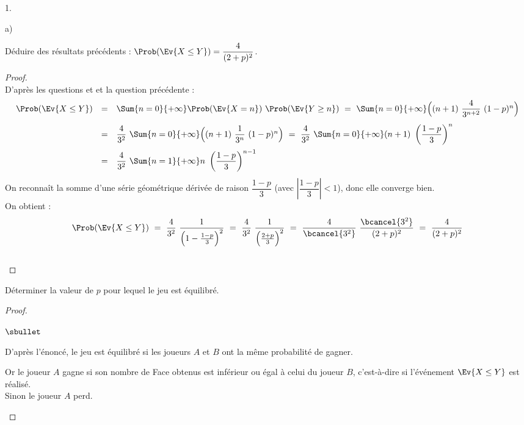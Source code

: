 \begin{noliste}{1.}
\begin{noliste}{a)}
  \item Déduire des résultats précédents : $\Prob(\Ev{X \leq Y}) =
    \dfrac{4}{(2+p)^2}$.
    
    \begin{proof}~\\
      D'après les questions  et  et la question 
      précédente :
      \[
        \begin{array}{rcl}
          \Prob(\Ev{X \leq Y}) & = &  \Sum{n=0}{+\infty}
          \Prob(\Ev{X=n}) \ \Prob(\Ev{Y \geq n})
          \ = \ \Sum{n=0}{+\infty} \Big( (n+1) \ \dfrac{4}{3^{n+2}} \
          (1-p)^n\Big)
          \\[.4cm]
          & = &  \dfrac{4}{3^2} \ \Sum{n=0}{+\infty} \Big( (n+1) \ 
          \dfrac{1}{3^n} \ (1-p)^n \Big)
          \ = \ \dfrac{4}{3^2} \ \Sum{n=0}{+\infty} (n+1) \
          \left( \dfrac{1-p}{3}\right)^n
          \\[.4cm]
          & = &  \dfrac{4}{3^2} \ \Sum{n=1}{+\infty} n \ \left(
          \dfrac{1-p}{3}\right)^{n-1} 
        \end{array}
      \]
      On reconnaît la somme d'une série géométrique dérivée de raison 
      $\dfrac{1-p}{3}$ (avec $\left\vert \dfrac{1-p}{3} \right\vert 
      <1$), donc elle converge bien.\\
      On obtient :
      \[
        \Prob(\Ev{X \leq Y}) \ = \ \dfrac{4}{3^2} \ 
        \dfrac{1}{\Big(1- \frac{1-p}{3}\Big)^2}
        \ = \ \dfrac{4}{3^2} \ \dfrac{1}{\Big(\frac{2+p}{3}\Big)^2}
        \ = \ \dfrac{4}{\bcancel{3^2}} \ 
        \dfrac{\bcancel{3^2}}{(2+p)^2} \ = \ 
        \dfrac{4}{(2+p)^2}
      \]
      ~\\[-1cm]
    \end{proof}

    
    \item Déterminer la valeur de $p$ pour lequel le jeu est équilibré.
    
    \begin{proof}~
      \begin{noliste}{$\sbullet$}
	\item D'après l'énoncé, le jeu est équilibré si les joueurs $A$
	et $B$ ont la même probabilité de gagner.
	
	\item Or le joueur $A$ gagne si son nombre de Face obtenus est 
	inférieur ou égal à celui du joueur $B$, c'est-à-dire si 
	l'événement $\Ev{X \leq Y}$ est réalisé.\\
	Sinon le joueur $A$ perd.
	

\end{noliste}
\end{proof}
\end{noliste}
\end{noliste}
